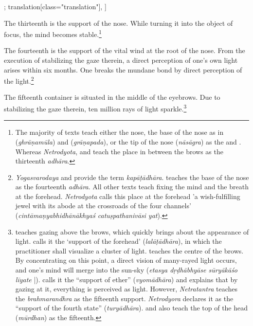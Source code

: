 \begin{alignment}[
  texts=edition[class="edition"];
  translation[class="translation"],
  ]
\begin{edition}
\begin{prose}[p30_05]
    \end{prose}
  \end{edition}
  \begin{translation}
    \begin{tlate}[p30_05]
      \noindent   
      The thirteenth is the support of the nose. While turning it into the object of focus, the mind becomes stable.\footnote{The majority of texts teach either the nose, the base of the nose as in  (\textit{ghrāṇamūla}) and  (\textit{grāṇapada}), or the tip of the nose (\textit{nāsāgra}) as the  and . Whereas \textit{Netrodyota},  and  teach the place in between the brows as the thirteenth \textit{adhāra}.}
      
      The fourteenth is the support of the vital wind at the root of the nose. From the execution of stabilizing the gaze therein, a direct perception of one’s own light arises within six months. One breaks the mundane bond by direct perception of the light.\footnote{\textit{Yogasvarodaya} and  provide the term \textit{kapāṭādhāra}.  teaches the base of the nose as the fourteenth \textit{adhāra}. All other texts teach fixing the mind and the breath at the forehead. \textit{Netrodyota} calls this place at the forehead ’a wish-fulfilling jewel with its abode at the crossroads of the four channels’ (\textit{cintāmaṇyabhidhānākhyaś catuṣpathanivāsi yat}).}     
            
      The fifteenth container is situated in the middle of the eyebrows. Due to stabilizing the gaze therein, ten million rays of light sparkle.\footnote{ teaches gazing above the brows, which quickly brings about the appearance of light.  calls it the `support of the forehead’ (\textit{lalāṭādhāra}), in which the practitioner shall visualize a cluster of light.  teaches the centre of the brows. By concentrating on this point, a direct vision of many-rayed light occurs, and one’s mind will merge into the sun-sky (\textit{etasya dṛḍhābhyāse sūryākāśo līyate} |).  calls it the “support of ether” (\textit{vyomādhāra}) and explains that by gazing at it, everything is perceived as light. However, \textit{Netratantra} teaches the \textit{brahmarandhra} as the fifteenth support. \textit{Netrodyora} declares it as the ``support of the fourth state'' (\textit{turyādhāra}).  and  also teach the top of the head (\textit{mūrdhan}) as the fifteenth.}
      

\end{tlate}
\end{translation}
\end{alignment}
